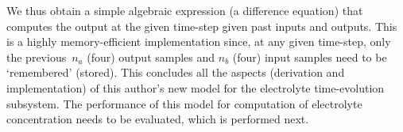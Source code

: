 We  thus obtain  a  simple  algebraic expression  (a  difference equation)  that
computes the output  at the given time-step given past  inputs and outputs. This
is a highly memory-efficient implementation  since, at any given time-step, only
the previous~$n_a$ (four) output samples  and $n_b$ (four) input samples need to
be  `remembered'  (stored).  This  concludes all  the  aspects  (derivation  and
implementation) of  this author's new  model for the  electrolyte time-evolution
subsystem.  The  performance  of  this  model  for  computation  of  electrolyte
concentration needs to be evaluated, which is performed next.

